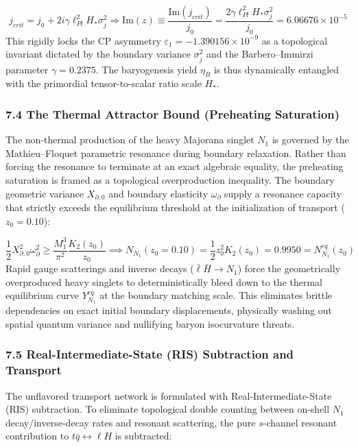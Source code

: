 \documentclass[aps,prd,onecolumn,superscriptaddress,nofootinbib,longbibliography,10pt]{revtex4-2}
\begin{document}
\[j_{crit} = j_0 + 2i\gamma \ell_{Pl}^2 H_* \sigma_j^2 \Rightarrow \text{Im}(z) \equiv \frac{\text{Im}(j_{crit})}{j_0} = \frac{2\gamma \ell_{Pl}^2 H_* \sigma_j^2}{j_0} = 6.06676 \times 10^{-5}\]
This rigidly locks the CP asymmetry \(\varepsilon_1 = -1.390156 \times 10^{-9}\) as a topological invariant dictated by the boundary variance \(\sigma_j^2\) and the Barbero--Immirzi parameter \(\gamma = 0.2375\). The baryogenesis yield \(\eta_B\) is thus dynamically entangled with the primordial tensor-to-scalar ratio scale \(H_*\).




\subsubsection*{7.4 The Thermal Attractor Bound (Preheating Saturation)}

The non-thermal production of the heavy Majorana singlet \(N_1\) is governed by the Mathieu--Floquet parametric resonance during boundary relaxation. Rather than forcing the resonance to terminate at an exact algebraic equality, the preheating saturation is framed as a topological overproduction inequality. The boundary geometric variance \(X_{\partial,0}\) and boundary elasticity \(\omega_\partial\) supply a resonance capacity that strictly exceeds the equilibrium threshold at the initialization of transport (\(z_0 = 0.10\)):


\[\frac{1}{2} X_{\partial,0}^2 \omega_\partial^2 \ge \frac{M_1^3}{\pi^2}\frac{K_2(z_0)}{z_0} \implies N_{N_1}(z_0 = 0.10) = \frac{1}{2}z_0^2 K_2(z_0) = 0.9950 = N_{N_1}^{eq}(z_0)\]
Rapid gauge scatterings and inverse decays (\(\bar{\ell}\bar{H} \to N_1\)) force the geometrically overproduced heavy singlets to deterministically bleed down to the thermal equilibrium curve \(Y_{N_1}^{eq}\) at the boundary matching scale. This eliminates brittle dependencies on exact initial boundary displacements, physically washing out spatial quantum variance and nullifying baryon isocurvature threats.




\subsubsection*{7.5 Real-Intermediate-State (RIS) Subtraction and Transport}

The unflavored transport network is formulated with Real-Intermediate-State (RIS) subtraction. To eliminate topological double counting between on-shell \(N_1\) decay/inverse-decay rates and resonant scattering, the pure \(s\)-channel resonant contribution to \(t\bar{q} \leftrightarrow \ell H\) is subtracted:
\end{document}
